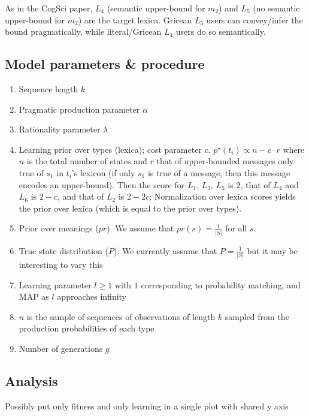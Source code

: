 \documentclass[a4paper]{article}
\newcommand{\hl}[1]{\textcolor[rgb]{.8,.33,.0}{#1}}%
\begin{document}
As in the CogSci paper, $L_4$ (semantic upper-bound for $m_2$) and $L_5$ (no semantic upper-bound for $m_2$) are the target lexica. Gricean $L_5$ users can convey/infer the bound pragmatically, while literal/Gricean $L_4$ users do so semantically.


\subsection{Model parameters \& procedure} 
\begin{enumerate}
  \item Sequence length $k$
  \item Pragmatic production parameter $\alpha$
  \item Rationality parameter $\lambda$
  \item Learning prior over types (lexica); cost parameter $c$. $p^\star(t_i) \propto n - c \cdot r$ where $n$ is the total number of states and $r$ that of upper-bounded messages only true of $s_1$ in $t_i$'s lexicon (if only $s_1$ is true of a message, then this message encodes an upper-bound). Then the score for $L_1$, $L_3$, $L_5$ is $2$, that of $L_4$ and $L_6$ is $2-c$, and that of $L_2$ is $2-2c$; Normalization over lexica scores yields the prior over lexica (which is equal to the prior over types).   
  \item Prior over meanings ($pr$). We assume that $pr(s) = \frac{1}{|S|}$ for all $s$.
  \item True state distribution ($P$). We currently assume that $P = \frac{1}{|S|}$ but it may be interesting to vary this
  \item Learning parameter $l \geq 1$ with $1$ corresponding to probability matching, and MAP as $l$ approaches infinity
  \item $n$ is the sample of sequences of observations of length $k$ sampled from the production probabilities of each type
  \item Number of generations $g$
\end{enumerate}


\subsection{Analysis}
\hl{Possibly put only fitness and only learning in a single plot with shared y axis}

%
\end{document}
